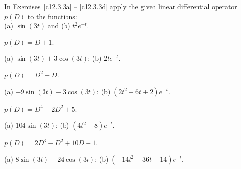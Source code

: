 \documentclass{ximera}
\begin{document}
\TEXER

\noindent In Exercises~\ref{c12.3.3a} -- \ref{c12.3.3d} apply the given
linear differential operator $p(D)$ to the functions: \\
(a) $\sin(3t)$ and  (b) $t^2 e^{-t}$.
\begin{exercise} \label{c12.3.3a}
$p(D) = D+1$.

\begin{solution}
\ans (a) $\sin(3t)+3\cos(3t)$; (b) $2te^{-t}$.

\end{solution}
\end{exercise}
\begin{exercise} \label{c12.3.3b}
$p(D) = D^2-D$.

\begin{solution}
\ans (a) $-9\sin(3t)-3\cos(3t)$; (b) $(2t^2-6t+2)e^{-t}$.

\end{solution}
\end{exercise}
\begin{exercise} \label{c12.3.3c}
$p(D) = D^4-2D^2+5$.

\begin{solution}
\ans (a) $104\sin(3t)$; (b) $(4t^2+8)e^{-t}$.

\end{solution}
\end{exercise}
\begin{exercise} \label{c12.3.3d}
$p(D) = 2D^3-D^2+10D-1$.

\begin{solution}
\ans (a) $8\sin(3t)-24\cos(3t)$; (b) $(-14t^2+36t-14)e^{-t}$.


\end{solution}
\end{exercise}
\end{document}
